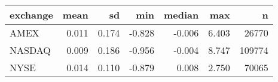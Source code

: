 
\begin{tabular}{lrrrrrr}
\toprule
exchange & mean & sd & min & median & max & n\\
\midrule
AMEX & 0.011 & 0.174 & -0.828 & -0.006 & 6.403 & 26770\\
NASDAQ & 0.009 & 0.186 & -0.956 & -0.004 & 8.747 & 109774\\
NYSE & 0.014 & 0.110 & -0.879 & 0.008 & 2.750 & 70065\\
\bottomrule
\end{tabular}
